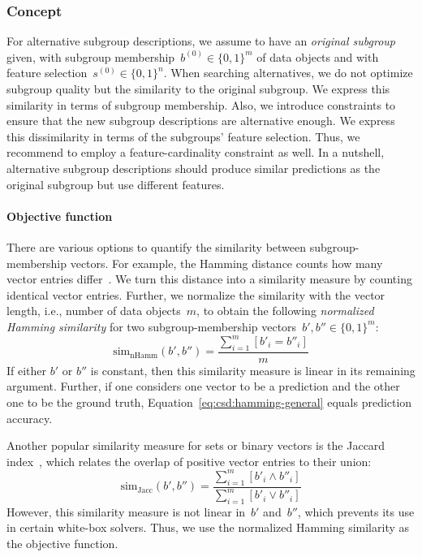 \documentclass{article}
\theoremstyle{definition}
\begin{document}
\subsubsection{Concept}
\label{sec:csd:approach:alternatives:concept}

For alternative subgroup descriptions, we assume to have an \emph{original subgroup} given, with subgroup membership~$b^{(0)} \in \{0, 1\}^m$ of data objects and with feature selection~$s^{(0)} \in \{0, 1\}^n$.
When searching alternatives, we do not optimize subgroup quality but the similarity to the original subgroup. 
We express this similarity in terms of subgroup membership.
Also, we introduce constraints to ensure that the new subgroup descriptions are alternative enough.
We express this dissimilarity in terms of the subgroups' feature selection.
Thus, we recommend to employ a feature-cardinality constraint as well.
In a nutshell, alternative subgroup descriptions should produce similar predictions as the original subgroup but use different features.

\paragraph{Objective function}

There are various options to quantify the similarity between subgroup-membership vectors.
For example, the Hamming distance counts how many vector entries differ~\cite{choi2010survey}.
We turn this distance into a similarity measure by counting identical vector entries.
Further, we normalize the similarity with the vector length, i.e., number of data objects~$m$, to obtain the following \emph{normalized Hamming similarity} for two subgroup-membership vectors~$b', b'' \in \{0, 1\}^m$:
%
\begin{equation}
	\text{sim}_{\text{nHamm}}(b', b'') = \frac{\sum_{i=1}^{m} [b'_i = b''_i]}{m}
	\label{eq:csd:hamming-general}
\end{equation}
%
If either $b'$ or $b''$ is constant, then this similarity measure is linear in its remaining argument.
Further, if one considers one vector to be a prediction and the other one to be the ground truth, Equation~\ref{eq:csd:hamming-general} equals prediction accuracy.

Another popular similarity measure for sets or binary vectors is the Jaccard index~\cite{choi2010survey}, which relates the overlap of positive vector entries to their union:
%
\begin{equation}
	\text{sim}_{\text{Jacc}}(b', b'') = \frac{\sum_{i=1}^{m} [b'_i \land b''_i ]}{\sum_{i=1}^{m} [b'_i \lor b''_i]}
	\label{eq:csd:jaccard}
\end{equation}
%
However, this similarity measure is not linear in~$b'$ and~$b''$, which prevents its use in certain white-box solvers.
Thus, we use the normalized Hamming similarity as the objective function.
\end{document}

